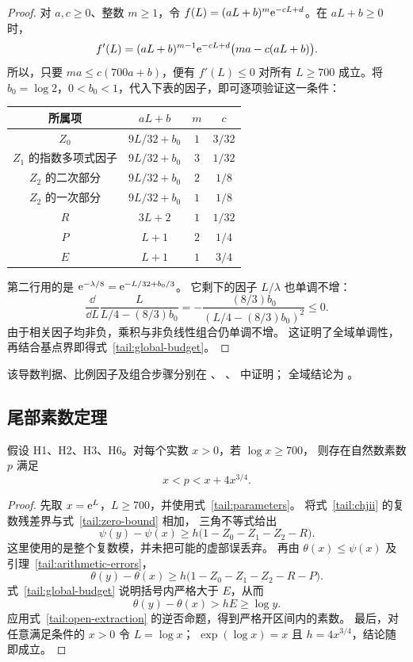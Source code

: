 \begin{proof}
对 $a,c\geq0$、整数 $m\geq1$，令
$f(L)=(aL+b)^m\mathrm e^{-cL+d}$。在 $aL+b\geq0$ 时，
\[
 f'(L)=(aL+b)^{m-1}\mathrm e^{-cL+d}
       \bigl(ma-c(aL+b)\bigr).
\]
所以，只要 $ma\leq c(700a+b)$，便有 $f'(L)\leq0$ 对所有 $L\geq700$
成立。将 $b_0=\log2$，$0<b_0<1$，代入下表的因子，即可逐项验证这一条件：
\begin{center}
\begin{tabular}{c|c|c|c}
所属项 & $aL+b$ & $m$ & $c$\\\hline
$Z_0$ & $9L/32+b_0$ & $1$ & $3/32$\\
$Z_1$ 的指数多项式因子 & $9L/32+b_0$ & $3$ & $1/32$\\
$Z_2$ 的二次部分 & $9L/32+b_0$ & $2$ & $1/8$\\
$Z_2$ 的一次部分 & $9L/32+b_0$ & $1$ & $1/8$\\
$R$ & $3L+2$ & $1$ & $1/32$\\
$P$ & $L+1$ & $2$ & $1/4$\\
$E$ & $L+1$ & $1$ & $3/4$
\end{tabular}
\end{center}
第二行用的是
$\mathrm e^{-\lambda/8}=\mathrm e^{-L/32+b_0/3}$。
它剩下的因子 $L/\lambda$ 也单调不增：
\[
 \frac{\dd}{\dd L}\frac{L}{L/4-(8/3)b_0}
 =-\frac{(8/3)b_0}{(L/4-(8/3)b_0)^2}\leq0.
\]
由于相关因子均非负，乘积与非负线性组合仍单调不增。
这证明了全域单调性，再结合基点界即得式~\eqref{tail:global-budget}。
\end{proof}

该导数判据、比例因子及组合步骤分别在
、
、
 中证明；
全域结论为 。

\subsection{尾部素数定理}

\begin{theorem}[无限尾部的严格短区间]\label{tail:prime-theorem}
假设 H1、H2、H3、H6。对每个实数 $x>0$，若 $\log x\geq700$，
则存在自然数素数 $p$ 满足
\[
 x<p<x+4x^{3/4}.
\]
\end{theorem}

\begin{proof}
先取 $x=\mathrm e^L$，$L\geq700$，并使用式~\eqref{tail:parameters}。
将式~\eqref{tail:chjii} 的复数残差界与式~\eqref{tail:zero-bound} 相加，
三角不等式给出
\[
 \psi(y)-\psi(x)
 \geq h\bigl(1-Z_0-Z_1-Z_2-R\bigr).
\]
这里使用的是整个复数模，并未把可能的虚部误丢弃。
再由 $\theta(x)\leq\psi(x)$ 及引理~\ref{tail:arithmetic-errors}，
\[
 \theta(y)-\theta(x)
 \geq h\bigl(1-Z_0-Z_1-Z_2-R-P\bigr).
\]
式~\eqref{tail:global-budget} 说明括号内严格大于 $E$，从而
\[
 \theta(y)-\theta(x)>hE\geq\log y.
\]
应用式~\eqref{tail:open-extraction} 的逆否命题，得到严格开区间内的素数。
最后，对任意满足条件的 $x>0$ 令 $L=\log x$；
$\exp(\log x)=x$ 且 $h=4x^{3/4}$，结论随即成立。
\end{proof}

